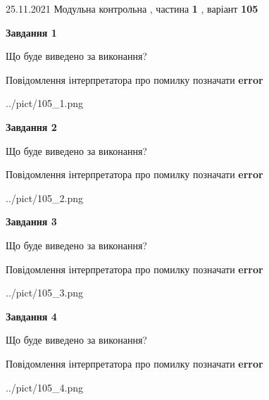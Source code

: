 \documentclass[10pt, ukrainian]{article}
\begin{document}
{25.11.2021 Модульна контрольна , частина \textbf { 1 }, варіант  \No \textbf { 105 }\par}
{
\begin {large}

{\begin {center}\textbf{Завдання 1}\end {center}}\par
Що буде виведено за виконання? \par
Повідомлення інтерпретатора про помилку позначати \textbf{error}

\begin{center}
	{../pict/105_1.png}
\end{center}
\newpage

{\begin {center}\textbf{Завдання 2}\end {center}}\par
Що буде виведено за виконання? \par
Повідомлення інтерпретатора про помилку позначати \textbf{error}

\begin{center}
	{../pict/105_2.png}
\end{center}
\newpage

{\begin {center}\textbf{Завдання 3}\end {center}}\par
Що буде виведено за виконання? \par
Повідомлення інтерпретатора про помилку позначати \textbf{error}

\begin{center}
	{../pict/105_3.png}
\end{center}
\newpage

{\begin {center}\textbf{Завдання 4}\end {center}}\par
Що буде виведено за виконання? \par
Повідомлення інтерпретатора про помилку позначати \textbf{error}

\begin{center}
	{../pict/105_4.png}
\end{center}
\newpage


\end{large}}
\end{document}
